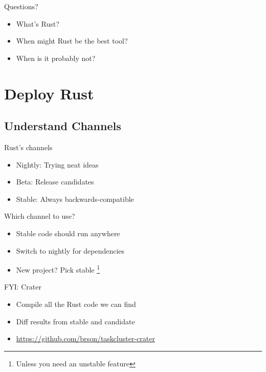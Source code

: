 \documentclass[50pt]{beamer}
\begin{document}
    \begin{frame}
        Questions?
        \begin{itemize}
            \item What's Rust?
            \item When might Rust be the best tool?
            \item When is it probably not?
        \end{itemize}
    \end{frame}

\section{Deploy Rust}

    \subsection{Understand Channels}

    \begin{frame}
        Rust's channels
        \begin{itemize}
            \item Nightly: Trying neat ideas
            \item Beta: Release candidates
            \item Stable: Always backwards-compatible
        \end{itemize}
    \end{frame}

    \begin{frame}
        Which channel to use?
        \begin{itemize}
            \item Stable code should run anywhere
            \item Switch to nightly for dependencies
            \item New project? Pick stable \footnote{Unless you need an
                  unstable feature}
        \end{itemize}
    \end{frame}

    \begin{frame}
        FYI: Crater
        \begin{itemize}
            \item Compile all the Rust code we can find
            \item Diff results from stable and candidate
            \item \url{https://github.com/brson/taskcluster-crater}
        \end{itemize}
    \end{frame}
\end{document}
